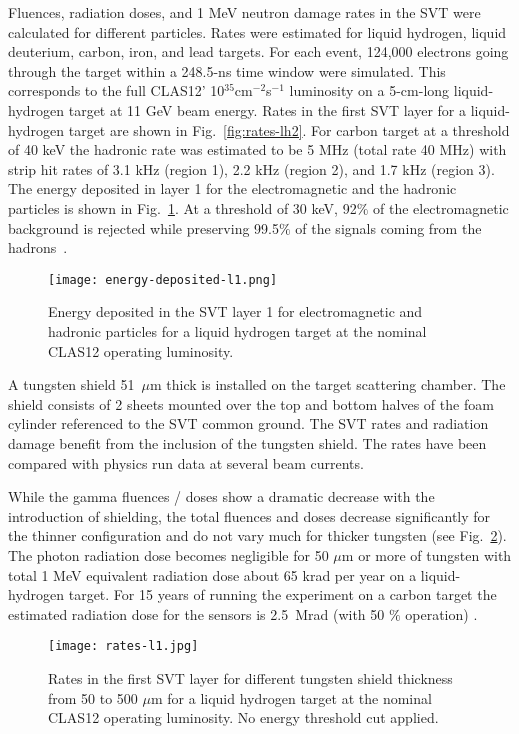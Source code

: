 Fluences, radiation doses, and 1 MeV neutron damage rates in the SVT were calculated for different particles. Rates were estimated for liquid hydrogen, liquid deuterium, carbon, iron, and lead targets. For each event, 124,000 electrons going through the target within a 248.5-ns time window were simulated. This corresponds to the full CLAS12' 10$^{35}$cm$^{-2}$s$^{-1}$ luminosity on a 5-cm-long liquid-hydrogen target at 11 GeV beam energy. Rates in the first SVT layer for a liquid-hydrogen target are shown in Fig.~\ref{fig:rates-lh2}. For carbon target at a threshold of 40 keV the hadronic rate was estimated to be 5 MHz (total rate 40 MHz) with strip hit rates of 3.1 kHz (region 1), 2.2 kHz (region 2), and 1.7 kHz (region 3). The energy deposited in layer 1 for the electromagnetic and the hadronic particles is shown in Fig.~\ref{fig:energy-deposited-l1}. At a threshold of 30 keV, 92$\%$ of the electromagnetic background is rejected while preserving  99.5$\%$ of the signals coming from the hadrons~\cite{TDRSVT}.

\begin{figure}[hbt] 
\centering 
\texttt{[image: energy-deposited-l1.png]}
\caption{Energy deposited in the SVT layer 1 for electromagnetic and hadronic particles for a liquid hydrogen target at the nominal CLAS12 operating luminosity.}
\label{fig:energy-deposited-l1}
\end{figure}

A tungsten shield 51~$\mu$m thick is installed on the target scattering chamber. The shield consists of 2 sheets mounted over the top and bottom halves of the foam cylinder referenced to the SVT common ground. The SVT rates and radiation damage benefit from the inclusion of the tungsten shield. The rates have been compared with physics run data at several beam currents.

While the gamma fluences / doses show a dramatic decrease with the introduction of shielding, the total fluences and doses decrease significantly for the thinner configuration and do not vary much for thicker tungsten (see Fig.~\ref{fig:rates-l1}). The photon radiation dose becomes negligible for 50 $\mu$m or more of tungsten with total 1 MeV equivalent radiation dose about 65 krad per year on a liquid-hydrogen target. For 15 years of running the experiment on a carbon target the estimated radiation dose for the sensors is 2.5~Mrad (with 50 $\%$ operation) \cite{TDRSVT}. 

\begin{figure}[hbt] 
\centering 
\texttt{[image: rates-l1.jpg]}
\caption{Rates in the first SVT layer for different tungsten shield thickness from 50 to 500 $\mu$m for a liquid hydrogen target at the nominal CLAS12 operating luminosity. No energy threshold cut applied.}
\label{fig:rates-l1}
\end{figure}

